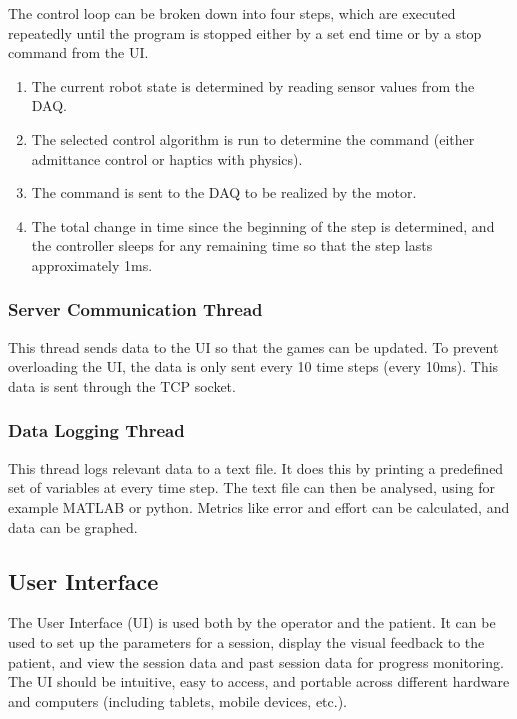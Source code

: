 \documentclass[12pt]{report}
\begin{document}
	The control loop can be broken down into four steps, which are executed repeatedly until the program is stopped either by a set end time or by a stop command from the UI. 
	
	\begin{enumerate}
		\item The current robot state is determined by reading sensor values from the DAQ.
		\item The selected control algorithm is run to determine the command (either admittance control or haptics with physics). 
		\item The command is sent to the DAQ to be realized by the motor. 
		\item The total change in time since the beginning of the step is determined, and the controller sleeps for any remaining time so that the step lasts approximately 1ms. 
	\end{enumerate}
	
	\subsubsection{Server Communication Thread}
	
	This thread sends data to the UI so that the games can be updated. To prevent overloading the UI, the data is only sent every 10 time steps (every 10ms). This data is sent through the TCP socket. 	
	
	\subsubsection{Data Logging Thread}
	This thread logs relevant data to a text file. It does this by printing a predefined set of variables at every time step. The text file can then be analysed, using for example MATLAB or python. Metrics like error and effort can be calculated, and data can be graphed. 
	
	\subsection{User Interface} 
	
	The User Interface (UI) is used both by the operator and the patient. It can be used to set up the parameters for a session, display the visual feedback to the patient, and  view the session data and past session data for progress monitoring. The UI should be intuitive, easy to access, and portable across different hardware and computers (including tablets, mobile devices, etc.).
	
\end{document}
